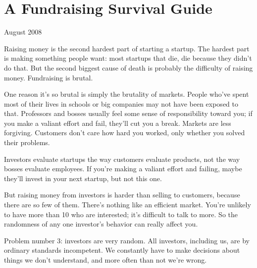 \chapter{A Fundraising Survival Guide}


            
              
                


                  
                    August 2008

Raising money is the second hardest
                    part of starting a startup. The hardest part is making
                    something people want: most startups that die, die because
                    they didn't do that. But the second biggest cause of death
                    is probably the difficulty of raising money. Fundraising is
                    brutal.

One reason it's so brutal is simply the
                    brutality of markets. People who've spent most of their
                    lives in schools or big companies may not have been exposed
                    to that. Professors and bosses usually feel some sense of
                    responsibility toward you; if you make a valiant effort and
                    fail, they'll cut you a break. Markets are less forgiving.
                    Customers don't care how hard you worked, only whether you
                    solved their problems.

Investors evaluate
                    startups the way customers evaluate products, not the way
                    bosses evaluate employees. If you're making a valiant effort
                    and failing, maybe they'll invest in your next startup, but
                    not this one.

But raising money from investors is
                    harder than selling to customers, because there are so few
                    of them. There's nothing like an efficient market. You're
                    unlikely to have more than 10 who are interested; it's
                    difficult to talk to more. So the randomness of any one
                    investor's behavior can really affect you.

Problem
                    number 3: investors are very random. All investors,
                    including us, are by ordinary standards incompetent. We
                    constantly have to make decisions about things we don't
                    understand, and more often than not we're wrong.

